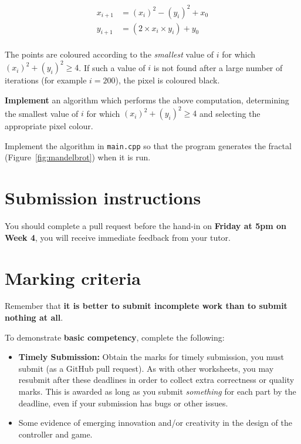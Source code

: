 \documentclass{../../../fal_assignment}
\begin{document}
\begin{align*}
x_{i+1} &= (x_i)^2 - (y_i)^2 + x_0 \\
y_{i+1} &= (2 \times x_i \times y_i) + y_0 \\
\end{align*}

The points are coloured according to the \emph{smallest} value of $i$ for which $(x_i)^2 + (y_i)^2 \geq 4$.
If such a value of $i$ is not found after a large number of iterations (for example $i=200$), the pixel is coloured black.

\textbf{Implement} an algorithm which performs the above computation, determining the smallest value of $i$
for which $(x_i)^2 + (y_i)^2 \geq 4$ and selecting the appropriate pixel colour.

Implement the algorithm in \texttt{main.cpp} so that the program generates the fractal (Figure~\ref{fig:mandelbrot}) when it is run.

\section*{Submission instructions}

You should complete a pull request before the hand-in on \textbf{Friday at 5pm on Week 4}, you will receive immediate feedback from your tutor. 
	
\section*{Marking criteria}
	
	Remember that \textbf{it is better to submit incomplete work than to submit nothing at all}. 
	
	To demonstrate \textbf{basic competency}, complete the following:
	\begin{itemize}
		\item \textbf{Timely Submission:} Obtain the marks for timely submission, you must submit (as a GitHub pull request).
		As with other worksheets, you may resubmit after these deadlines in order to collect extra correctness or quality marks.
		This is awarded as long as you submit \emph{something} for each part by the deadline,
		even if your submission has bugs or other issues.
		\item Some evidence of emerging innovation and/or creativity in the design of the controller and game.
	\end{itemize} 
	
\end{document}
